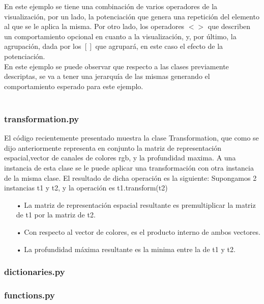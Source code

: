 En este ejemplo se tiene una combinaci\'on de varios operadores de la visualizaci\'on, por un lado, la potenciaci\'on que genera una repetici\'on del elemento al que se le aplica la misma. Por otro lado, los operadores $< >$ que describen un comportamiento opcional en cuanto a la visualizaci\'on, y, por \'ultimo, la agrupación, dada por los $[ ]$ que agrupar\'a, en este caso el efecto de la potenciaci\'on. \\
En este ejemplo se puede observar que respecto a las clases previamente descriptas, se va a tener una jerarqu\'ia de las mismas generando el comportamiento esperado para este ejemplo.\\
\\

\newpage
\subsubsection{transformation.py}



El c\'odigo recientemente presentado muestra la clase Transformation, que como se dijo anteriormente representa en conjunto la matriz de representaci\'on espacial,vector de canales de colores rgb, y la profundidad maxima.
A una instancia de esta clase se le puede aplicar una transformaci\'on con otra instancia de la misma clase. El resultado de dicha operaci\'on es la siguiente:
Supongamos 2 instancias t1 y t2, y la operaci\'on es t1.transform(t2)
\begin{itemize}
\item[•] La matriz de representaci\'on espacial resultante es premultiplicar la matriz de t1 por la matriz de t2. 
\item[•] Con respecto al vector de colores, es el producto interno de ambos vectores.
\item[•] La profundidad m\'axima resultante es la minima entre la de t1 y t2. 
\end{itemize}

\newpage
\subsubsection{dictionaries.py}


\newpage
\subsubsection{functions.py}

